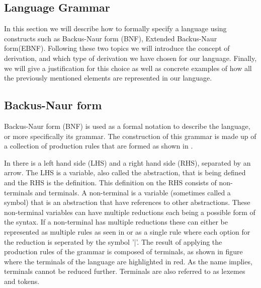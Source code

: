 \subsection{Language Grammar} \label{langGram}

In this section we will describe how to formally specify a language using constructs such as Backus-Naur form (BNF), Extended Backus-Naur form(EBNF).
Following these two topics we will introduce the concept of derivation, and which type of derivation we have chosen for our language.
Finally, we will give a justification for this choice as well as concrete examples of how all the previously mentioned elements are represented in our language.

\subsection{Backus-Naur form}

Backus-Naur form (BNF) is used as a formal notation to describe the language, or more specifically its grammar.
The construction of this grammar is made up of a collection of production rules that are formed as shown in .


In  there is a left hand side (LHS) and a right hand side (RHS), separated by an arrow. The LHS is a variable, also called the abstraction, that is being defined and the RHS is the definition.
This definition on the RHS consists of non-terminals and terminals. A non-terminal is a variable (sometimes called a symbol) that is an abstraction that have references to other abstractions.
These non-terminal variables can have multiple reductions each being a possible form of the syntax.
If a non-terminal has multiple reductions these can either be represented as multiple rules as seen in  or as a single rule where each option for the reduction is seperated by the symbol '|'.
The result of applying the production rules of the grammar is composed of terminals, as shown in figure  where the terminals of the language are highlighted in red.
As the name implies, terminals cannot be reduced further. Terminals are also referred to as lexemes and tokens\cite{sebesta_concepts_2016}.


